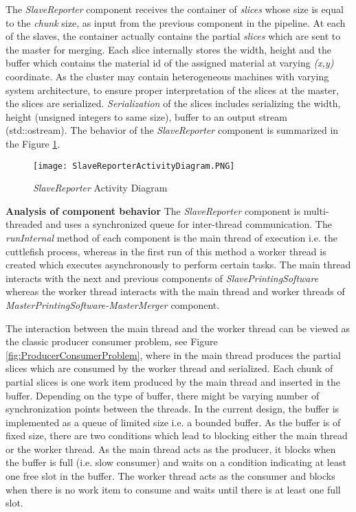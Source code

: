 The \textit{SlaveReporter} component receives the container of \textit{slices} whose size is equal to the \textit{chunk} size, as input from the previous component in the pipeline. At each of the slaves, the container actually contains the partial \textit{slices} which are sent to the master for merging.  Each slice internally stores the width, height and the buffer which contains the material id of the assigned material at varying \textit{(x,y)} coordinate. As the cluster may contain heterogeneous machines with varying system architecture, to ensure proper interpretation of the slices at the master, the slices are serialized. \textit{Serialization} of the slices includes serializing the width, height (unsigned integers to same size), buffer to an output stream (std::ostream). The behavior of the \textit{SlaveReporter} component is summarized in the Figure \ref{fig:SlaveReporterActivityDiagram}. \newline
\begin{figure}[ht!]
\centering
\texttt{[image: SlaveReporterActivityDiagram.PNG]}
\caption{\textit{SlaveReporter} Activity Diagram}
\label{fig:SlaveReporterActivityDiagram}
\end{figure}

\textbf{Analysis of component behavior}
\newline
The \textit{SlaveReporter} component is multi-threaded and uses a synchronized queue for inter-thread communication. The \textit{runInternal} method of each component is the main thread of execution i.e. the cuttlefish process, whereas in the first run of this method a worker thread is created which executes asynchronously to perform certain tasks. The main thread interacts with the next and previous components of \textit{SlavePrintingSoftware} whereas the worker thread interacts with the main thread and worker threads of \textit{MasterPrintingSoftware-MasterMerger} component. \newline

The interaction between the main thread and the worker thread can be viewed as the classic producer consumer problem, see Figure \ref{fig:ProducerConsumerProblem}, where in the main thread produces the partial slices which are consumed by the worker thread and serialized. Each chunk of partial slices is one work item produced by the main thread and inserted in the buffer. Depending on the type of buffer, there might be varying number of synchronization points between the threads. In the current design, the buffer is implemented as a queue of limited size i.e. a bounded buffer. As the buffer is of fixed size, there are two conditions which lead to blocking either the main thread or the worker thread. As the main thread acts as the producer, it blocks when the buffer is full (i.e. slow consumer) and waits on a condition indicating at least one free slot in the buffer. The worker thread acts as the consumer and blocks when there is no work item to consume and waits until there is at least one full slot. \newline


